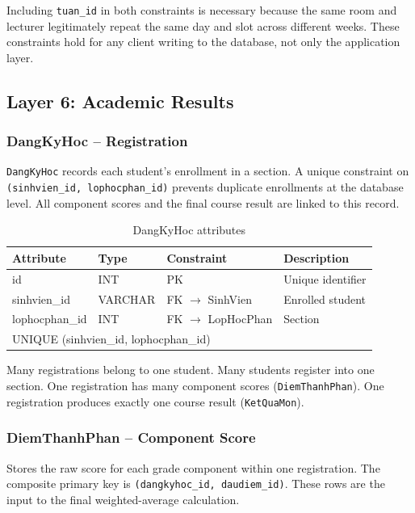\documentclass[12pt,a4paper]{report}
\begin{document}
Including \texttt{tuan\_id} in both constraints is necessary because the same room and lecturer legitimately repeat the same day and slot across different weeks. These constraints hold for any client writing to the database, not only the application layer.

\subsection{Layer 6: Academic Results}

\subsubsection{DangKyHoc -- Registration}

\texttt{DangKyHoc} records each student's enrollment in a section. A unique constraint on \texttt{(sinhvien\_id, lophocphan\_id)} prevents duplicate enrollments at the database level. All component scores and the final course result are linked to this record.

\begin{table}[H]
\renewcommand{\arraystretch}{1.35}
\caption{DangKyHoc attributes}
\label{tab:dangkyhoc}
\begin{tabular}{|p{3.5cm}|p{2.5cm}|p{3cm}|p{4.5cm}|}
  \hline
  \textbf{Attribute} & \textbf{Type} & \textbf{Constraint} & \textbf{Description} \\
  \hline
  id & INT & PK & Unique identifier \\
  \hline
  sinhvien\_id & VARCHAR & FK $\to$ SinhVien & Enrolled student \\
  \hline
  lophocphan\_id & INT & FK $\to$ LopHocPhan & Section \\
  \hline
  \multicolumn{4}{|l|}{UNIQUE (sinhvien\_id, lophocphan\_id)} \\
  \hline
\end{tabular}
\end{table}

Many registrations belong to one student. Many students register into one section. One registration has many component scores (\texttt{DiemThanhPhan}). One registration produces exactly one course result (\texttt{KetQuaMon}).

\subsubsection{DiemThanhPhan -- Component Score}

Stores the raw score for each grade component within one registration. The composite primary key is \texttt{(dangkyhoc\_id, daudiem\_id)}. These rows are the input to the final weighted-average calculation.
\end{document}
